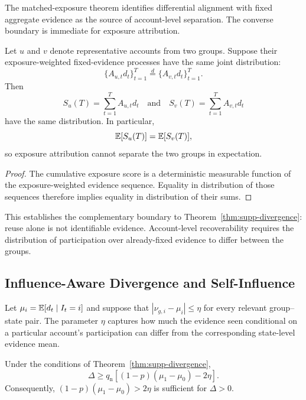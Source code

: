 The matched-exposure theorem identifies differential alignment with fixed
aggregate evidence as the source of account-level separation. The converse
boundary is immediate for exposure attribution.

\begin{proposition}
\label{prop:supp-nonidentifiability}
Let $u$ and $v$ denote representative accounts from two groups. Suppose their
exposure-weighted fixed-evidence processes have the same joint
distribution:
\[
\{A_{u,t}d_t\}_{t=1}^T
\overset{d}{=}
\{A_{v,t}d_t\}_{t=1}^T.
\]
Then
\[
S_u(T)
=
\sum_{t=1}^T A_{u,t}d_t
\quad\text{and}\quad
S_v(T)
=
\sum_{t=1}^T A_{v,t}d_t
\]
have the same distribution. In particular,
\[
\mathbb{E}[S_u(T)]
=
\mathbb{E}[S_v(T)],
\]
so exposure attribution cannot separate the two groups in expectation.
\end{proposition}

\begin{proof}
The cumulative exposure score is a deterministic measurable function of the
exposure-weighted evidence sequence. Equality in distribution of those
sequences therefore implies equality in distribution of their sums.
\end{proof}

This establishes the complementary boundary to
Theorem~\ref{thm:supp-divergence}: reuse alone is not identifiable evidence.
Account-level recoverability requires the distribution of participation over
already-fixed evidence to differ between the groups.


\subsection{Influence-Aware Divergence and Self-Influence}
\label{sec:supp-influence}

Let $\mu_i=\mathbb{E}[d_t\mid I_t=i]$ and suppose that
$|\nu_{g,i}-\mu_i|\leq\eta$ for every relevant group--state pair.
The parameter $\eta$ captures how much the evidence seen conditional on a
particular account's participation can differ from the corresponding
state-level evidence mean.

\begin{corollary}
\label{cor:supp-influence}
Under the conditions of Theorem~\ref{thm:supp-divergence},
\begin{equation}
\label{eq:supp-influence-bound}
\Delta
\geq
q_{\mathrm n}
\left[
(1-p)(\mu_1-\mu_0)-2\eta
\right].
\end{equation}
Consequently, $(1-p)(\mu_1-\mu_0)>2\eta$ is sufficient for
$\Delta>0$.
\end{corollary}

